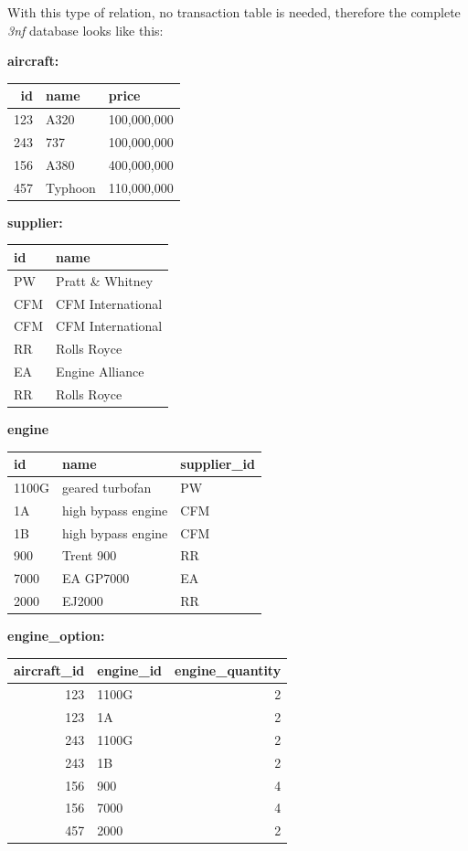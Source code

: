 \documentclass[10pt]{article}
\begin{document}
With this type of relation, no transaction table is needed, therefore the complete \emph{3nf} database looks like this:

\textbf{aircraft:}

\begin{center}
\begin{tabular}{rll}
\hline
id & name & price\\
\hline
123 & A320 & 100,000,000\\
243 & 737 & 100,000,000\\
156 & A380 & 400,000,000\\
457 & Typhoon & 110,000,000\\
\hline
\end{tabular}
\end{center}

\textbf{supplier:}

\begin{center}
\begin{tabular}{ll}
\hline
id & name\\
\hline
PW & Pratt \& Whitney\\
CFM & CFM International\\
CFM & CFM International\\
RR & Rolls Royce\\
EA & Engine Alliance\\
RR & Rolls Royce\\
\hline
\end{tabular}
\end{center}

\textbf{engine}

\begin{center}
\begin{tabular}{lll}
\hline
id & name & supplier\_id\\
\hline
1100G & geared turbofan & PW\\
1A & high bypass engine & CFM\\
1B & high bypass engine & CFM\\
900 & Trent 900 & RR\\
7000 & EA GP7000 & EA\\
2000 & EJ2000 & RR\\
\hline
\end{tabular}
\end{center}

\textbf{engine\_option:}

\begin{center}
\begin{tabular}{rlr}
\hline
aircraft\_id & engine\_id & engine\_quantity\\
\hline
123 & 1100G & 2\\
123 & 1A & 2\\
243 & 1100G & 2\\
243 & 1B & 2\\
156 & 900 & 4\\
156 & 7000 & 4\\
457 & 2000 & 2\\
\hline
\end{tabular}
\end{center}
\end{document}
